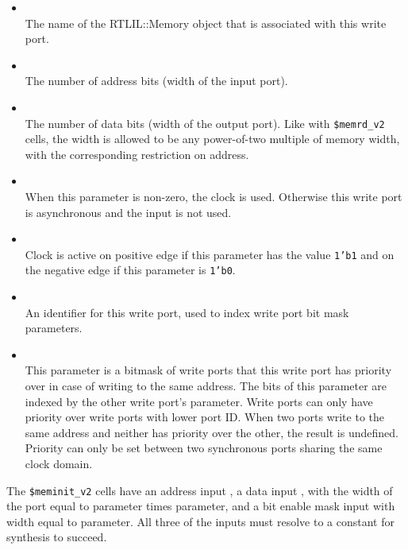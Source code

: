\begin{itemize}
\item {} \\
The name of the RTLIL::Memory object that is associated with this write port.

\item {} \\
The number of address bits (width of the  input port).

\item {} \\
The number of data bits (width of the  output port). Like with {\tt \$memrd\_v2} cells,
the width is allowed to be any power-of-two multiple of memory width, with the corresponding
restriction on address.

\item {} \\
When this parameter is non-zero, the clock is used. Otherwise this write port is asynchronous and
the  input is not used.

\item {} \\
Clock is active on positive edge if this parameter has the value {\tt 1'b1} and on the negative
edge if this parameter is {\tt 1'b0}.

\item {} \\
An identifier for this write port, used to index write port bit mask parameters.

\item {} \\
This parameter is a bitmask of write ports that this write port has priority over in case of writing
to the same address.  The bits of this parameter are indexed by the other write port's  parameter.
Write ports can only have priority over write ports with lower port ID.  When two ports write to the same
address and neither has priority over the other, the result is undefined.  Priority can only be set between
two synchronous ports sharing the same clock domain.
\end{itemize}

The {\tt \$meminit\_v2} cells have an address input , a data input , with the width
of the  port equal to  parameter times  parameter, and a bit enable mask input
 with width equal to  parameter. All three of the inputs
must resolve to a constant for synthesis to succeed.

